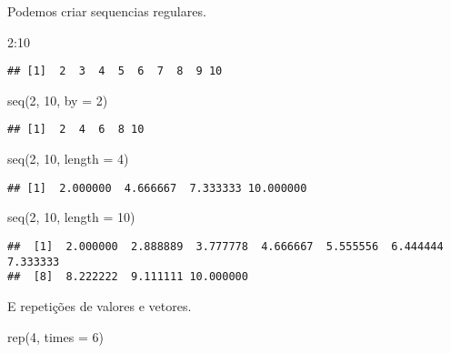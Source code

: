 \documentclass[
]{book}
\newenvironment{Shaded}{\begin{snugshade}}{\end{snugshade}}
\newcommand{\AttributeTok}[1]{\textcolor[rgb]{0.77,0.63,0.00}{#1}}
\newcommand{\DecValTok}[1]{\textcolor[rgb]{0.00,0.00,0.81}{#1}}
\newcommand{\FunctionTok}[1]{\textcolor[rgb]{0.00,0.00,0.00}{#1}}
\newcommand{\NormalTok}[1]{#1}
\newcommand{\SpecialCharTok}[1]{\textcolor[rgb]{0.00,0.00,0.00}{#1}}
\begin{document}
Podemos criar sequencias regulares.

\begin{Shaded}
\begin{Highlighting}[]
\DecValTok{2}\SpecialCharTok{:}\DecValTok{10}
\end{Highlighting}
\end{Shaded}

\begin{verbatim}
## [1]  2  3  4  5  6  7  8  9 10
\end{verbatim}

\begin{Shaded}
\begin{Highlighting}[]
\FunctionTok{seq}\NormalTok{(}\DecValTok{2}\NormalTok{, }\DecValTok{10}\NormalTok{, }\AttributeTok{by =} \DecValTok{2}\NormalTok{)}
\end{Highlighting}
\end{Shaded}

\begin{verbatim}
## [1]  2  4  6  8 10
\end{verbatim}

\begin{Shaded}
\begin{Highlighting}[]
\FunctionTok{seq}\NormalTok{(}\DecValTok{2}\NormalTok{, }\DecValTok{10}\NormalTok{, }\AttributeTok{length =} \DecValTok{4}\NormalTok{)}
\end{Highlighting}
\end{Shaded}

\begin{verbatim}
## [1]  2.000000  4.666667  7.333333 10.000000
\end{verbatim}

\begin{Shaded}
\begin{Highlighting}[]
\FunctionTok{seq}\NormalTok{(}\DecValTok{2}\NormalTok{, }\DecValTok{10}\NormalTok{, }\AttributeTok{length =} \DecValTok{10}\NormalTok{)}
\end{Highlighting}
\end{Shaded}

\begin{verbatim}
##  [1]  2.000000  2.888889  3.777778  4.666667  5.555556  6.444444  7.333333
##  [8]  8.222222  9.111111 10.000000
\end{verbatim}

E repetições de valores e vetores.

\begin{Shaded}
\begin{Highlighting}[]
\FunctionTok{rep}\NormalTok{(}\DecValTok{4}\NormalTok{, }\AttributeTok{times =} \DecValTok{6}\NormalTok{)}
\end{Highlighting}
\end{Shaded}
\end{document}
